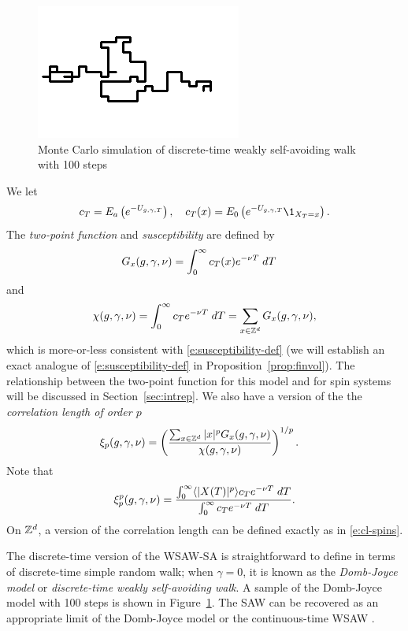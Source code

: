 \begin{figure}[!htb]
\centering
\label{fig:domb-joyce}
\includegraphics{domb-joyce-black-small.png}
\caption{Monte Carlo simulation of discrete-time weakly self-avoiding walk with 100 steps}
\end{figure}

We let
\begin{equation}
\label{e:c}
    c_T = E_a\left(e^{-U_{\gcc,\gamma,T}}\right),
    \quad
    c_T(x) = E_0\left(e^{-U_{\gcc,\gamma,T}}\1_{X_T = x}\right).
\end{equation}
The \emph{two-point function} and \emph{susceptibility} are defined by
\begin{align}
\lbeq{Gsa}
G_x(\gcc,\gamma,\nu)
    &=
\int_0^\infty c_T(x) e^{-\nu T} \; dT
\end{align}
and
\begin{equation}
\label{e:suscept-def}
\chi(g, \gamma, \nu)
	=
\int_0^\infty c_T e^{-\nu T} \; dT
	=
\sum_{x\in{ {{\mathbb Z}}^d }} G_x(g,\gamma,\nu),
\end{equation}
which is more-or-less consistent with \eqref{e:susceptibility-def} (we will
establish an exact analogue of \eqref{e:susceptibility-def} in Proposition~\ref{prop:finvol}).
The relationship
between the two-point function for this model and for spin systems will be
discussed in Section~\ref{sec:intrep}. We also have a version of the
the \emph{correlation length of order $p$}
\begin{align}
\label{e:clp-wsawsa}
\xi_p(g, \gamma, \nu)
	&=
\left(\frac{\sum_{x\in{ {{\mathbb Z}}^d }} |x|^p G_x(g, \gamma, \nu)}{\chi(g, \gamma, \nu)}\right)^{1/p}.
\end{align}
Note that
\begin{equation}
\xi_p^p(g,\gamma,\nu)
	=
\frac
{\int_0^\infty \langle |X(T)|^p \rangle c_T e^{-\nu T} \; dT}
{\int_0^\infty c_T e^{-\nu T} \; dT}.
\end{equation}
On ${ {{\mathbb Z}}^d }$, a version of the correlation length can be defined exactly as in \eqref{e:cl-spins}.

The discrete-time version of the WSAW-SA is straightforward to define in terms of
discrete-time simple random walk; when
$\gamma = 0$, it is known as the \emph{Domb-Joyce model} or \emph{discrete-time
weakly self-avoiding walk}. A sample of the Domb-Joyce model with 100 steps is shown
in Figure~\ref{fig:domb-joyce}. The SAW can be recovered as an
appropriate limit of the Domb-Joyce model or the continuous-time WSAW \cite{BDS12}.

